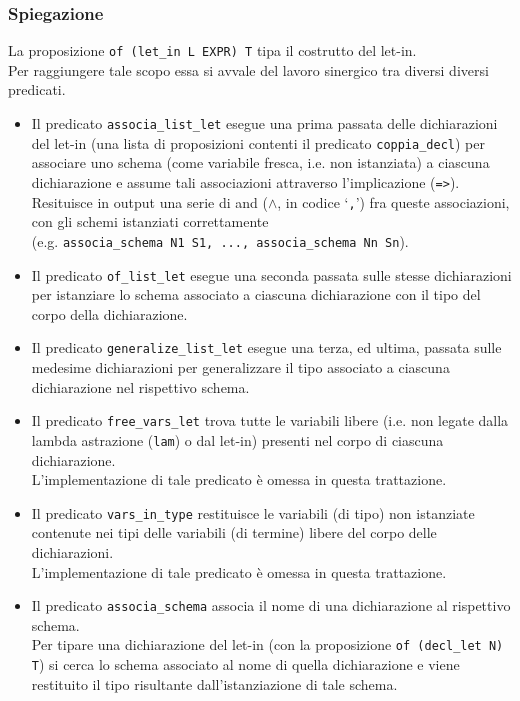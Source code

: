 \documentclass[12pt,a4paper,openright,twoside]{report}
\begin{document}
\subsubsection{Spiegazione}
La proposizione \verb"of (let_in L EXPR) T" tipa il costrutto del let-in.\\
Per raggiungere tale scopo essa si avvale del lavoro sinergico tra diversi diversi predicati.
\begin{itemize}
 \item Il predicato \verb"associa_list_let" esegue una prima passata delle dichiarazioni del let-in (una lista di proposizioni contenti il predicato \verb"coppia_decl") per associare uno schema (come variabile fresca, i.e. non istanziata) a ciascuna dichiarazione e assume tali associazioni attraverso l'implicazione (\verb"=>").\\
 Resituisce in output una serie di and ($\wedge$, in codice `\verb","') fra queste associazioni, con gli schemi istanziati correttamente\\
 (e.g. \verb"associa_schema N1 S1, ..., associa_schema Nn Sn").
 \item Il predicato \verb"of_list_let" esegue una seconda passata sulle stesse dichiarazioni per istanziare lo schema associato a ciascuna dichiarazione con il tipo del corpo della dichiarazione.
 \item Il predicato \verb"generalize_list_let" esegue una terza, ed ultima, passata sulle medesime dichiarazioni per generalizzare il tipo associato a ciascuna dichiarazione nel rispettivo schema.
 \item Il predicato \verb"free_vars_let" trova tutte le variabili libere (i.e. non legate dalla lambda astrazione (\verb"lam") o dal let-in) presenti nel corpo di ciascuna dichiarazione.\\
 L'implementazione di tale predicato è omessa in questa trattazione.
 \item Il predicato \verb"vars_in_type" restituisce le variabili (di tipo) non istanziate contenute nei tipi delle variabili (di termine) libere del corpo delle dichiarazioni.\\
 L'implementazione di tale predicato è omessa in questa trattazione.
 \item Il predicato \verb"associa_schema" associa il nome di una dichiarazione al rispettivo schema.\\
 Per tipare una dichiarazione del let-in (con la proposizione \verb"of (decl_let N) T") si cerca lo schema associato al nome di quella dichiarazione e viene restituito il tipo risultante dall'istanziazione di tale schema.

\end{itemize}
\end{document}
